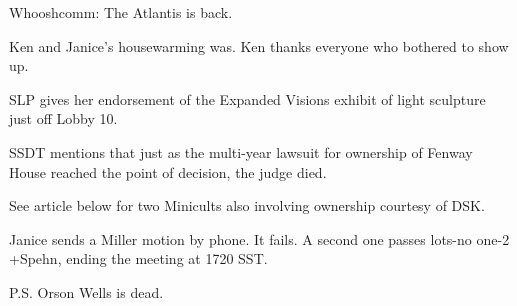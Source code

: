 \documentclass[12pt]{article}
\begin{document}
Whooshcomm: The Atlantis is back.

Ken and Janice's housewarming was. Ken thanks everyone who bothered to show up.

SLP gives her endorsement of the Expanded Visions exhibit of light sculpture just off Lobby 10.

SSDT mentions that just as the multi-year lawsuit for ownership of Fenway House reached the point of decision, the judge died.

See article below for two Minicults also involving ownership courtesy of DSK.

Janice sends a Miller motion by phone. It fails. A second one passes lots-no one-2 +Spehn, ending the meeting at 1720 SST.

P.S. Orson Wells is dead.
\end{document}
